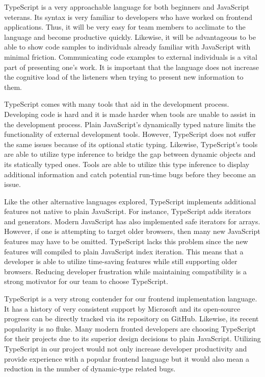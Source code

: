 \documentclass[12pt]{report}
\begin{document}
TypeScript is a very approachable language for both beginners and JavaScript veterans. Its syntax is very familiar to developers who have worked on frontend applications. Thus, it will be very easy for team members to acclimate to the language and become productive quickly. Likewise, it will be advantageous to be able to show code samples to individuals already familiar with JavaScript with minimal friction. Communicating code examples to external individuals is a vital part of presenting one's work. It is important that the language does not increase the cognitive load of the listeners when trying to present new information to them.

TypeScript comes with many tools that aid in the development process. Developing code is hard and it is made harder when tools are unable to assist in the development process. Plain JavaScript's dynamically typed nature limits the functionality of external development tools. However, TypeScript does not suffer the same issues because of its optional static typing. Likewise, TypeScript's tools are able to utilize type inference to bridge the gap between dynamic objects and its statically typed ones.\cite{typescripthomepage} Tools are able to utilize this type inference to display additional information and catch potential run-time bugs before they become an issue.

Like the other alternative languages explored, TypeScript implements additional features not native to plain JavaScript. For instance, TypeScript adds iterators and generators. Modern JavaScript has also implemented safe iterators for arrays. However, if one is attempting to target older browsers, then many new JavaScript features may have to be omitted. TypeScript lacks this problem since the new features will compiled to plain JavaScript index iteration. This means that a developer is able to utilize time-saving features while still supporting older browsers. Reducing developer frustration while maintaining compatibility is a strong motivator for our team to choose TypeScript.

TypeScript is a very strong contender for our frontend implementation language. It has a history of very consistent support by Microsoft and its open-source progress can be directly tracked via its repository on GitHub. Likewise, its recent popularity is no fluke. Many modern fronted developers are choosing TypeScript for their projects due to its superior design decisions to plain JavaScript. Utilizing TypeScript in our project would not only increase developer productivity and provide experience with a popular frontend language but it would also mean a reduction in the number of dynamic-type related bugs.
\end{document}
